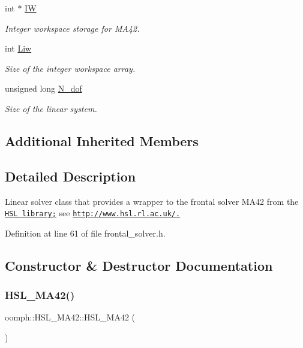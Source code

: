 \begin{DoxyCompactItemize}
int $\ast$ \hyperlink{classoomph_1_1HSL__MA42_aee49355d4011d4867ec6ed92823b4162}{IW}
\begin{DoxyCompactList}\small\item\em Integer workspace storage for M\+A42. \end{DoxyCompactList}\item 
int \hyperlink{classoomph_1_1HSL__MA42_a6ae8fb349617e5b1dfe64bb7a822de3c}{Liw}
\begin{DoxyCompactList}\small\item\em Size of the integer workspace array. \end{DoxyCompactList}\item 
unsigned long \hyperlink{classoomph_1_1HSL__MA42_aff8698e483ecef88d1a326ebe300a7ce}{N\+\_\+dof}
\begin{DoxyCompactList}\small\item\em Size of the linear system. \end{DoxyCompactList}\end{DoxyCompactItemize}
\subsection*{Additional Inherited Members}


\subsection{Detailed Description}
Linear solver class that provides a wrapper to the frontal solver M\+A42 from the \href{http://www.hsl.rl.ac.uk/}{\tt H\+SL library;} see \href{http://www.hsl.rl.ac.uk/}{\tt http\+://www.\+hsl.\+rl.\+ac.\+uk/.} 

Definition at line 61 of file frontal\+\_\+solver.\+h.



\subsection{Constructor \& Destructor Documentation}
\mbox{\label{classoomph_1_1HSL__MA42_adb51ab900d877ac6721745c1b6a9c76d}} 
\subsubsection{\texorpdfstring{H\+S\+L\+\_\+\+M\+A42()}{HSL\_MA42()}\hspace{0.1cm}{\footnotesize\ttfamily [1/2]}}
{\footnotesize\ttfamily oomph\+::\+H\+S\+L\+\_\+\+M\+A42\+::\+H\+S\+L\+\_\+\+M\+A42 (\begin{DoxyParamCaption}{ }\end{DoxyParamCaption})\hspace{0.3cm}{\ttfamily [inline]}}



